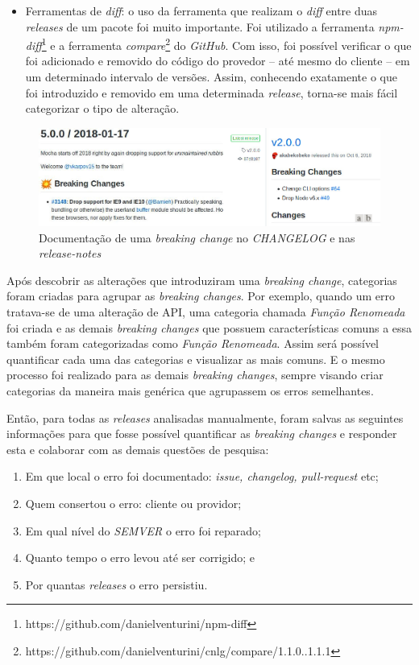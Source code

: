 \begin{itemize}
    \item Ferramentas de \textit{diff}: o uso da ferramenta que realizam o  \textit{diff} entre duas \textit{releases} de um pacote foi muito importante. Foi utilizado a ferramenta \textit{npm-diff}\footnote{https://github.com/danielventurini/npm-diff} e a ferramenta \textit{compare}\footnote{https://github.com/danielventurini/cnlg/compare/1.1.0..1.1.1} do \textit{GitHub}. Com isso, foi possível verificar o que foi adicionado e removido do código do provedor -- até mesmo do cliente -- em um determinado intervalo de versões. Assim, conhecendo exatamente o que foi introduzido e removido em uma determinada \textit{release}, torna-se mais fácil categorizar o tipo de alteração.
\end{itemize}

\begin{figure}
    \centering
    \includegraphics[scale=0.45]{figuras/bc_documentation.jpeg}
    \caption{Documentação de uma \textit{breaking change} no \textit{CHANGELOG} e nas \textit{release-notes}}
    \label{fig:bc_documentation}
\end{figure}{}

Após descobrir as alterações que introduziram uma \textit{breaking change}, categorias foram criadas para agrupar as \textit{breaking changes}. Por exemplo, quando um erro tratava-se de uma alteração de \gls{API}, uma categoria chamada \textit{Função Renomeada} foi criada e as demais \textit{breaking changes} que possuem características comuns a essa também foram categorizadas como \textit{Função Renomeada}. Assim será possível quantificar cada uma das categorias e visualizar as mais comuns. E o mesmo processo foi realizado para as demais \textit{breaking changes}, sempre visando criar categorias da maneira mais genérica que agrupassem os erros semelhantes.

Então, para todas as \textit{releases} analisadas manualmente, foram salvas as seguintes informações para que fosse possível quantificar as \textit{breaking changes} e responder esta e colaborar com as demais questões de pesquisa:

\begin{enumerate}
    \item Em que local o erro foi documentado: \textit{issue, changelog, pull-request} etc;
    \item Quem consertou o erro: cliente ou providor;
    \item Em qual nível do \textit{SEMVER} o erro foi reparado;
    \item Quanto tempo o erro levou até ser corrigido; e
    \item Por quantas \textit{releases} o erro persistiu.
\end{enumerate}{}

